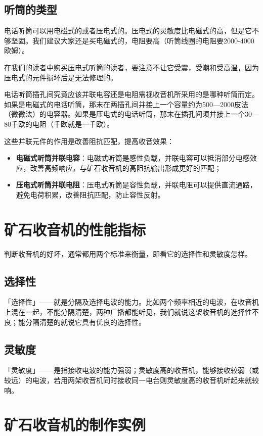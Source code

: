 \documentclass[12pt,UTF8]{ctexbook}
\begin{document}
\section{听筒的类型}

电话听筒可以用电磁式的或者压电式的。压电式的灵敏度比电磁式的高，但是它不够坚固。我们建议大家还是买电磁式的，电阻要高（听筒线圈的电阻要2000-4000欧姆）。

在我们的读者中购买压电式听筒的读者，要注意不让它受震，受潮和受高温，因为压电式的元件损坏后是无法修理的。

电话听筒插孔间究竟应该并联电容还是电阻需视收音机所采用的是哪种听筒而定。如果是电磁式的电话听筒，那末在两插孔间并接上一个容量约为500—2000皮法（微微法）的电容器。如果是压电式的电话听筒，那末在插孔间须并接上一个30—80千欧的电阻（千欧就是一千欧）。

这些并联元件的作用是改善阻抗匹配，提高收音效果：
\begin{itemize}
  \item \textbf{电磁式听筒并联电容}：电磁式听筒是感性负载，并联电容可以抵消部分电感效应，改善高频响应，与矿石收音机的高阻抗输出形成更好的匹配；
  \item \textbf{压电式听筒并联电阻}：压电式听筒是容性负载，并联电阻可以提供直流通路，避免电荷积累，改善阻抗匹配，防止容性反射。
\end{itemize}

\chapter{矿石收音机的性能指标}

判断收音机的好坏，通常都用两个标准来衡量，即看它的选择性和灵敏度怎样。

\section{选择性}

「选择性」——就是分隔及选择电波的能力。比如两个频率相近的电波，在收音机上混在一起，不能分隔清楚，两种广播都能听见，我们就说这架收音机的选择性不良；能分隔清楚的就说它具有优良的选择性。

\section{灵敏度}

「灵敏度」——是指接收电波的能力强弱；灵敏度高的收音机，能够接收较弱（或较远）的电波，若用两架收音机同时接收同一电台则灵敏度高的收音机听起来就较响。

\chapter{矿石收音机的制作实例}
\end{document}
